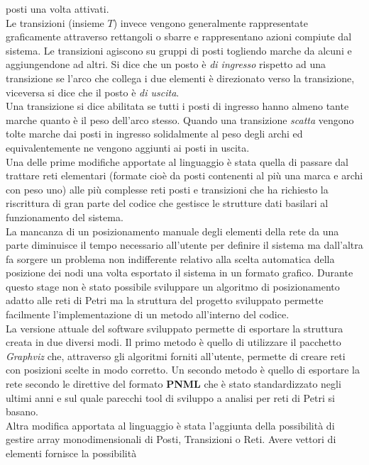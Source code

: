 \documentclass[italian,12pt]{book}
\begin{document}
 posti una volta attivati.\\
 Le transizioni (insieme $T$) invece vengono generalmente rappresentate
 graficamente attraverso rettangoli o sbarre e rappresentano azioni
 compiute dal sistema. Le transizioni agiscono su gruppi di posti 
 togliendo marche da alcuni e aggiungendone ad altri. Si dice che un
 posto è \emph{di ingresso} rispetto ad una transizione se l'arco che
 collega i due elementi è direzionato verso la transizione, viceversa
 si dice che il posto è \emph{di uscita}.\\ 
 Una transizione si dice abilitata se tutti i posti di ingresso
 hanno almeno tante marche quanto è il peso dell'arco stesso. Quando
 una transizione \emph{scatta} vengono tolte marche dai posti in
 ingresso solidalmente al peso degli archi ed equivalentemente ne
 vengono aggiunti ai posti in uscita.\\
 Una delle prime modifiche apportate al linguaggio è stata quella di
 passare dal trattare reti elementari (formate cioè da posti contenenti
 al più una marca e archi con peso uno) alle più complesse reti posti e transizioni
 che ha richiesto la riscrittura di gran parte del codice che gestisce
 le strutture dati basilari al funzionamento del sistema.\\
 La mancanza di un posizionamento manuale degli elementi della rete da
 una parte diminuisce il tempo necessario all'utente per definire il
 sistema ma dall'altra fa sorgere un problema non indifferente relativo
 alla scelta automatica della posizione dei nodi una volta esportato il
 sistema in un formato grafico. Durante questo stage non è stato
 possibile sviluppare un algoritmo di posizionamento adatto alle reti
 di Petri ma la struttura del progetto sviluppato permette facilmente
 l'implementazione di un metodo all'interno del codice.\\
 La versione attuale del software sviluppato permette di esportare la
 struttura creata in due diversi modi. Il primo metodo è quello di
 utilizzare il pacchetto \emph{Graphviz} che, attraverso gli algoritmi
 forniti all'utente, permette di creare reti con posizioni scelte in
 modo corretto. Un secondo metodo è quello di esportare la rete secondo le 
 direttive del formato {\bf PNML} che è stato standardizzato negli ultimi anni e
 sul quale parecchi tool di sviluppo a analisi per reti di Petri si basano. \\
 Altra modifica apportata al linguaggio è stata l'aggiunta della possibilità di gestire array
 monodimensionali di Posti, Transizioni o Reti. Avere vettori di elementi fornisce la possibilità 
\end{document}
